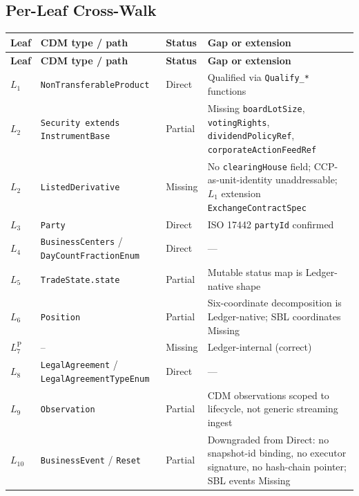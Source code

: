 \documentclass[11pt,a4paper]{article}
\begin{document}
\subsection{Per-Leaf Cross-Walk}
\label{sec:cdm-perleaf}

\begin{center}
\renewcommand{\arraystretch}{1.10}
\begin{longtable}{@{}p{1cm}p{4.5cm}p{2cm}p{8.0cm}@{}}
\toprule
\textbf{Leaf} & \textbf{CDM type / path} & \textbf{Status} & \textbf{Gap or extension} \\
\midrule
\endfirsthead
\toprule
\textbf{Leaf} & \textbf{CDM type / path} & \textbf{Status} & \textbf{Gap or extension} \\
\midrule
\endhead
\bottomrule
\endfoot
$L_1$    & \texttt{NonTransferableProduct}                   & Direct   & Qualified via \texttt{Qualify\_*} functions \\
$L_2$    & \texttt{Security extends InstrumentBase}          & Partial  & Missing \texttt{boardLotSize}, \texttt{votingRights}, \texttt{dividendPolicyRef}, \texttt{corporateActionFeedRef} \\
$L_2$    & \texttt{ListedDerivative}                          & Missing  & No \texttt{clearingHouse} field; CCP-as-unit-identity unaddressable; $L_1$ extension \texttt{ExchangeContractSpec} \\
$L_3$    & \texttt{Party}                                     & Direct   & ISO 17442 \texttt{partyId} confirmed \\
$L_4$    & \texttt{BusinessCenters} / \texttt{DayCountFractionEnum} & Direct & — \\
$L_5$    & \texttt{TradeState.state}                          & Partial  & Mutable status map is Ledger-native shape \\
$L_6$    & \texttt{Position}                                  & Partial  & Six-coordinate decomposition is Ledger-native; SBL coordinates Missing \\
$L_7^{\mathrm{P}}$ & --                                       & Missing  & Ledger-internal (correct) \\
$L_8$    & \texttt{LegalAgreement} / \texttt{LegalAgreementTypeEnum} & Direct & — \\
$L_9$    & \texttt{Observation}                                & Partial  & CDM observations scoped to lifecycle, not generic streaming ingest \\
$L_{10}$ & \texttt{BusinessEvent} / \texttt{Reset}             & Partial  & Downgraded from Direct: no snapshot-id binding, no executor signature, no hash-chain pointer; SBL events Missing \\

\end{longtable}
\end{center}
\end{document}
